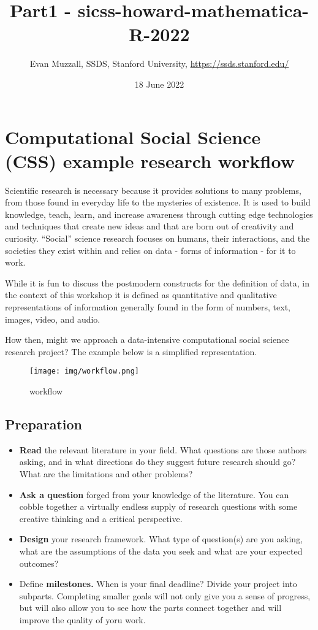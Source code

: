 \documentclass[
]{article}
\title{Part1 - sicss-howard-mathematica-R-2022}
\author{Evan Muzzall, SSDS, Stanford University,
\url{https://ssds.stanford.edu/}}
\date{18 June 2022}
\providecommand{\tightlist}{%
  \setlength{\itemsep}{0pt}\setlength{\parskip}{0pt}}
\begin{document}
\maketitle

{
\setcounter{tocdepth}{2}
\tableofcontents
}
\hypertarget{computational-social-science-css-example-research-workflow}{%
\section{Computational Social Science (CSS) example research
workflow}\label{computational-social-science-css-example-research-workflow}}

Scientific research is necessary because it provides solutions to many
problems, from those found in everyday life to the mysteries of
existence. It is used to build knowledge, teach, learn, and increase
awareness through cutting edge technologies and techniques that create
new ideas and that are born out of creativity and curiosity. ``Social''
science research focuses on humans, their interactions, and the
societies they exist within and relies on data - forms of information -
for it to work.

While it is fun to discuss the postmodern constructs for the definition
of data, in the context of this workshop it is defined as quantitative
and qualitative representations of information generally found in the
form of numbers, text, images, video, and audio.

How then, might we approach a data-intensive computational social
science research project? The example below is a simplified
representation.

\begin{figure}
\centering
\texttt{[image: img/workflow.png]}
\caption{workflow}
\end{figure}

\hypertarget{preparation}{%
\subsection{Preparation}\label{preparation}}

\begin{itemize}
\tightlist
\item
  \textbf{Read} the relevant literature in your field. What questions
  are those authors asking, and in what directions do they suggest
  future research should go? What are the limitations and other
  problems?
\item
  \textbf{Ask a question} forged from your knowledge of the literature.
  You can cobble together a virtually endless supply of research
  questions with some creative thinking and a critical perspective.
\item
  \textbf{Design} your research framework. What type of question(s) are
  you asking, what are the assumptions of the data you seek and what are
  your expected outcomes?
\item
  Define \textbf{milestones.} When is your final deadline? Divide your
  project into subparts. Completing smaller goals will not only give you
  a sense of progress, but will also allow you to see how the parts
  connect together and will improve the quality of yoru work.
\end{itemize}
\end{document}
